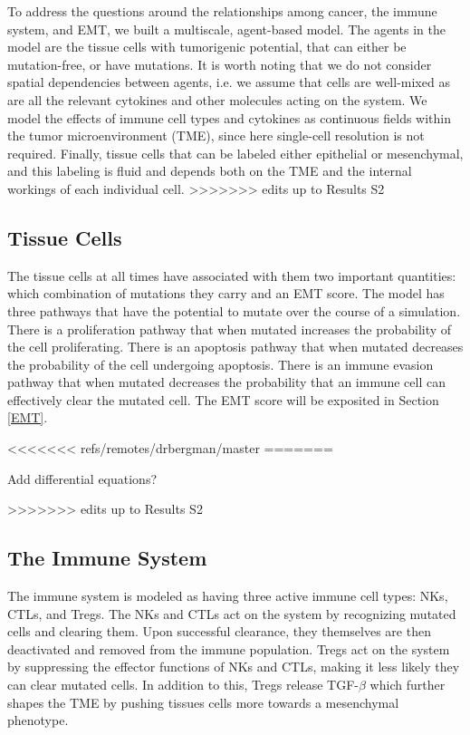 \documentclass{article}
\begin{document}
To address the questions around the relationships among cancer, the immune system, and EMT, we built a multiscale, agent-based model.
The agents in the model are the tissue cells with tumorigenic potential, that can either be mutation-free, or have mutations.
It is worth noting that we do not consider spatial dependencies between agents, i.e. we assume that cells are well-mixed as are all the relevant cytokines and other molecules acting on the system.
We model the effects of immune cell types and cytokines as continuous fields within the tumor microenvironment (TME), since here single-cell resolution is not required. 
Finally, tissue cells that can be labeled either epithelial or mesenchymal, and this labeling is fluid and depends both on the TME and the internal workings of each individual cell.
>>>>>>> edits up to Results S2

\subsection{Tissue Cells}\label{TissueCells}
The tissue cells at all times have associated with them two important quantities: which combination of mutations they carry and an EMT score.
The model has three pathways that have the potential to mutate over the course of a simulation.
There is a proliferation pathway that when mutated increases the probability of the cell proliferating.
There is an apoptosis pathway that when mutated decreases the probability of the cell undergoing apoptosis.
There is an immune evasion pathway that when mutated decreases the probability that an immune cell can effectively clear the mutated cell.
The EMT score will be exposited in Section \ref{EMT}. %



<<<<<<< refs/remotes/drbergman/master
=======

Add differential equations? %

>>>>>>> edits up to Results S2
\subsection{The Immune System}\label{ImmuneSystem}
The immune system is modeled as having three active immune cell types: NKs, CTLs, and Tregs.
The NKs and CTLs act on the system by recognizing mutated cells and clearing them.
Upon successful clearance, they themselves are then deactivated and removed from the immune population.
%
Tregs act on the system by suppressing the effector functions of NKs and CTLs, making it less likely they can clear mutated cells.
In addition to this, Tregs release TGF-$\beta$ which further shapes the TME by pushing tissues cells more towards a mesenchymal phenotype.
\end{document}
